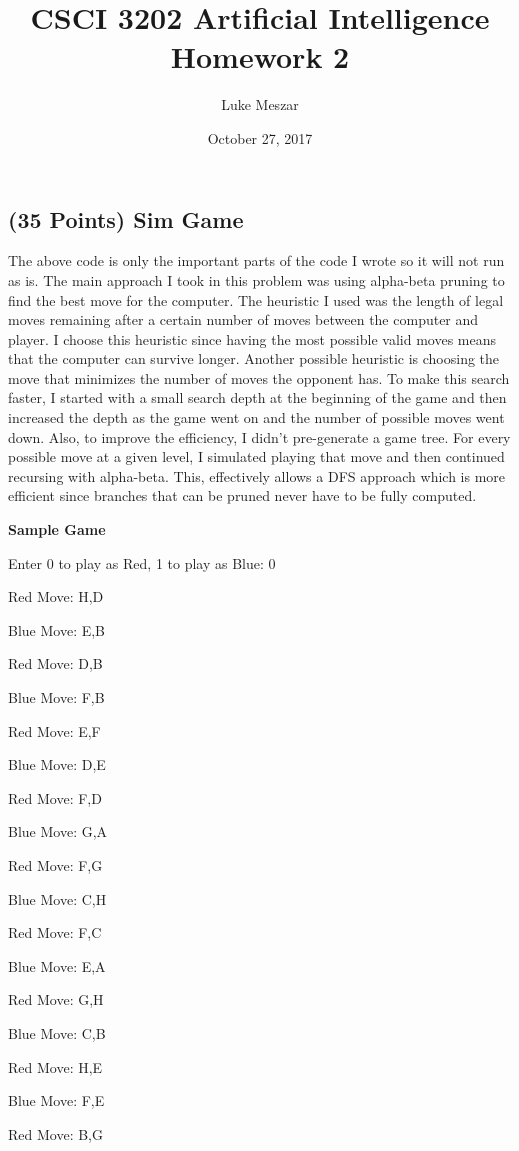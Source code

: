 \documentclass{article}
\title{CSCI 3202 Artificial Intelligence Homework 2}
\author{Luke Meszar}
\date{October 27, 2017}
\begin{document}
	\maketitle
	\subsection{(35 Points) Sim Game}
	
	The above code is only the important parts of the code I wrote so it will not run as is. The main approach I took in this problem was using alpha-beta pruning to find the best move for the computer. The heuristic I used was the length of legal moves remaining after a  certain number of moves between the computer and player. I choose this heuristic since having the most possible valid moves means that the computer can survive longer. Another possible heuristic is choosing the move that minimizes the number of moves the opponent has. To make this search faster, I started with a small search depth at the beginning of the game and then increased the depth as the game went on and the number of possible moves went down. Also, to improve the efficiency, I didn't pre-generate a game tree. For every possible move at a given level, I simulated playing that move and then continued recursing with alpha-beta. This, effectively allows a DFS approach which is more efficient since branches that can be pruned never have to be fully computed. 
	
	\textbf{Sample Game}
	
	Enter 0 to play as Red, 1 to play as Blue: 0
	
	Red Move: H,D
	
	Blue Move: E,B
	
	Red Move: D,B 
	
	Blue Move: F,B
	
	Red Move: E,F
	
	Blue Move: D,E
	
	Red Move: F,D
	
	Blue Move: G,A 
	
	Red Move: F,G
	
	Blue Move: C,H
	
	Red Move: F,C
	
	Blue Move: E,A
	
	Red Move: G,H
	
	Blue Move: C,B
	
	Red Move: H,E
	
	Blue Move: F,E
	
	Red Move: B,G
	
\end{document}

